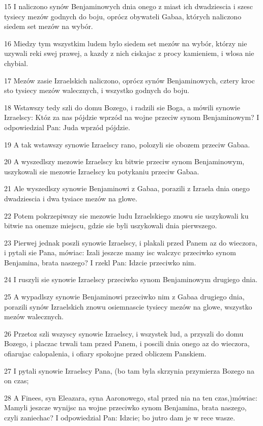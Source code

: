\par 15 I naliczono synów Benjaminowych dnia onego z miast ich dwadziescia i szesc tysiecy mezów godnych do boju, oprócz obywateli Gabaa, których naliczono siedem set mezów na wybór.
\par 16 Miedzy tym wszystkim ludem bylo siedem set mezów na wybór, którzy nie uzywali reki swej prawej, a kazdy z nich ciskajac z procy kamieniem, i wlosa nie chybial.
\par 17 Mezów zasie Izraelskich naliczono, oprócz synów Benjaminowych, cztery kroc sto tysiecy mezów walecznych, i wszystko godnych do boju.
\par 18 Wstawszy tedy szli do domu Bozego, i radzili sie Boga, a mówili synowie Izraelscy: Któz za nas pójdzie wprzód na wojne przeciw synom Benjaminowym? I odpowiedzial Pan: Juda wprzód pójdzie.
\par 19 A tak wstawszy synowie Izraelscy rano, polozyli sie obozem przeciw Gabaa.
\par 20 A wyszedlszy mezowie Izraelscy ku bitwie przeciw synom Benjaminowym, uszykowali sie mezowie Izraelscy ku potykaniu przeciw Gabaa.
\par 21 Ale wyszedlszy synowie Benjaminowi z Gabaa, porazili z Izraela dnia onego dwadziescia i dwa tysiace mezów na glowe.
\par 22 Potem pokrzepiwszy sie mezowie ludu Izraelskiego znowu sie uszykowali ku bitwie na onemze miejscu, gdzie sie byli uszykowali dnia pierwszego.
\par 23 Pierwej jednak poszli synowie Izraelscy, i plakali przed Panem az do wieczora, i pytali sie Pana, mówiac: Izali jeszcze mamy isc walczyc przeciwko synom Benjamina, brata naszego? I rzekl Pan: Idzcie przeciwko nim.
\par 24 I ruszyli sie synowie Izraelscy przeciwko synom Benjaminowym drugiego dnia.
\par 25 A wypadlszy synowie Benjaminowi przeciwko nim z Gabaa drugiego dnia, porazili synów Izraelskich znowu osiemnascie tysiecy mezów na glowe, wszystko mezów walecznych.
\par 26 Przetoz szli wszyscy synowie Izraelscy, i wszystek lud, a przyszli do domu Bozego, i placzac trwali tam przed Panem, i poscili dnia onego az do wieczora, ofiarujac calopalenia, i ofiary spokojne przed obliczem Panskiem.
\par 27 I pytali synowie Izraelscy Pana, (bo tam byla skrzynia przymierza Bozego na on czas;
\par 28 A Finees, syn Eleazara, syna Aaronowego, stal przed nia na ten czas,)mówiac: Mamyli jeszcze wynijsc na wojne przeciwko synom Benjamina, brata naszego, czyli zaniechac? I odpowiedzial Pan: Idzcie; bo jutro dam je w rece wasze.
